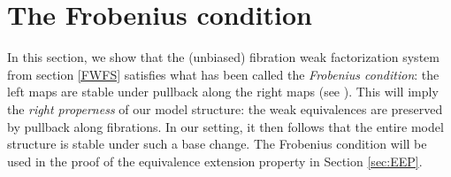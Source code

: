 \documentclass[12pt]{article}
\newcommand{\cSet}{\ensuremath{\mathsf{cSet}}}
\newcommand{\mono}{\ensuremath{\rightarrowtail}}
\newcommand{\ra}{\ensuremath{\rightarrow}}
\newcommand{\I}{\ensuremath{\mathrm{I}}}
\newtheorem{proposition}[theorem]{Proposition}
\theoremstyle{remark}
\newtheorem{remark}[theorem]{Remark}
\theoremstyle{definition}
\newtheorem{definition}[theorem]{Definition}
\begin{document}
%
%
%
%
%

\section{The Frobenius condition}\label{sec:Frobenius}

In this section, we show that the (unbiased) fibration weak factorization system from section \ref{FWFS} satisfies what has been called the \emph{Frobenius condition}: the left maps are stable under pullback along the right maps (see \cite{vdBG}).  This will imply the \emph{right properness} of our model structure: the weak equivalences are preserved by pullback along fibrations.  In our setting, it then follows that the entire model structure is stable under such a base change.  The Frobenius condition will be used in the proof of the equivalence extension property in Section \ref{sec:EEP}.  
\end{document}
